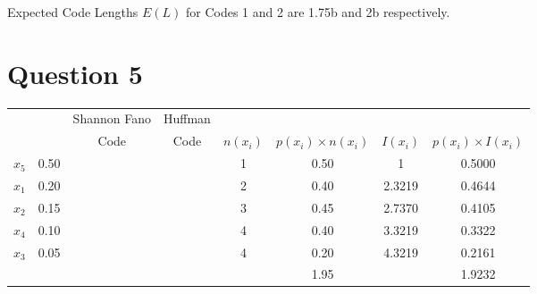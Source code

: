 \documentclass[a4paper,12pt]{article}
\begin{document}
Expected Code Lengths $E(L)$ for Codes 1 and 2 are 1.75b and 2b respectively.

\section*{Question 5}
\begin{center}
\begin{tabular}{|c|c|c|c|c|c|c|c|}
\hline	&		&	Shannon Fano	&	Huffman	&		&		&		&	\\	
	&		&	 Code	&	Code	&	$n(x_i)$	&	$p(x_i) \times n(x_i)$	&	$I(x_i)$	&	$p(x_i) \times I(x_i)$	\\ \hline
$x_5$	&	0.50	&		&		&	1	&	0.50	&	1	&	0.5000	\\ \hline
$x_1$	&	0.20	&		&		&	2	&	0.40	&	2.3219	&	0.4644	\\ \hline
$x_2$	&	0.15	&		&		&	3	&	0.45	&	2.7370	&	0.4105	\\ \hline
$x_4$	&	0.10	&		&		&	4	&	0.40	&	3.3219	&	0.3322	\\ \hline
$x_3$	&	0.05	&		&		&	4	&	0.20	&	4.3219	&	0.2161	\\ \hline
	&		&		&		&		&	1.95	&		&	1.9232	\\ \hline
 
\end{tabular} 
\end{center}
\end{document}
